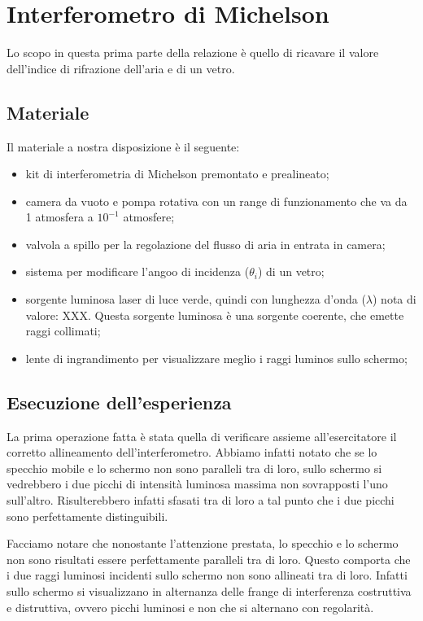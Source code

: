 \section{Interferometro di Michelson}

Lo scopo in questa prima parte della relazione è quello di ricavare il valore dell'indice di rifrazione dell'aria e di un vetro.

\subsection{Materiale}
Il materiale a nostra disposizione è il seguente:
\begin{itemize}
	\item{kit di interferometria di Michelson premontato e prealineato;}
    \item{camera da vuoto e pompa rotativa con un range di funzionamento che va da 1 atmosfera a $10^{-1}$ atmosfere;}
	\item{valvola a spillo per la regolazione del flusso di aria in entrata in camera;}
	\item{sistema per modificare l'angoo di incidenza ($\theta_i$) di un vetro;}
	\item{sorgente luminosa laser di luce verde, quindi con lunghezza d'onda ($\lambda$) nota di valore: XXX. Questa sorgente luminosa è una sorgente coerente, che emette raggi collimati;}
	\item{lente di ingrandimento per visualizzare meglio i raggi luminos sullo schermo;}
\end{itemize}

\subsection{Esecuzione dell'esperienza}
La prima operazione fatta è stata quella di verificare assieme all'esercitatore il corretto allineamento dell'interferometro. Abbiamo infatti notato che se lo specchio mobile e lo schermo non sono paralleli tra di loro, sullo schermo si vedrebbero i due picchi di intensità luminosa massima non sovrapposti l'uno sull'altro. Risulterebbero infatti sfasati tra di loro a tal punto che i due picchi sono perfettamente distinguibili.

Facciamo notare che nonostante l'attenzione prestata, lo specchio e lo schermo non sono risultati essere perfettamente paralleli tra di loro. Questo comporta che i due raggi luminosi incidenti sullo schermo non sono allineati tra di loro. Infatti sullo schermo si visualizzano in alternanza delle frange di interferenza costruttiva e distruttiva, ovvero picchi luminosi e non che si alternano con regolarità.

